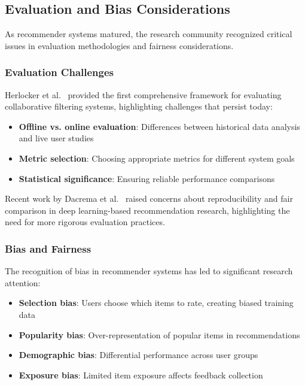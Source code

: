 \subsection{Evaluation and Bias Considerations}

As recommender systems matured, the research community recognized critical issues in evaluation methodologies and fairness considerations.

\subsubsection{Evaluation Challenges}
Herlocker et al.~\cite{herlocker2004evaluating} provided the first comprehensive framework for evaluating collaborative filtering systems, highlighting challenges that persist today:
\begin{itemize}
    \item \textbf{Offline vs. online evaluation}: Differences between historical data analysis and live user studies
    \item \textbf{Metric selection}: Choosing appropriate metrics for different system goals
    \item \textbf{Statistical significance}: Ensuring reliable performance comparisons
\end{itemize}

Recent work by Dacrema et al.~\cite{dacrema2019we} raised concerns about reproducibility and fair comparison in deep learning-based recommendation research, highlighting the need for more rigorous evaluation practices.

\subsubsection{Bias and Fairness}
The recognition of bias in recommender systems has led to significant research attention:
\begin{itemize}
    \item \textbf{Selection bias}: Users choose which items to rate, creating biased training data~\cite{marlin2007collaborative}
    \item \textbf{Popularity bias}: Over-representation of popular items in recommendations~\cite{abdollahpouri2019unfairness}
    \item \textbf{Demographic bias}: Differential performance across user groups~\cite{ekstrand2022fairness}
    \item \textbf{Exposure bias}: Limited item exposure affects feedback collection~\cite{joachims2017accurately}
\end{itemize}

